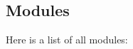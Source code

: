 \subsection{Modules}
Here is a list of all modules\+:\begin{DoxyCompactList}
\item {}
\end{DoxyCompactList}
